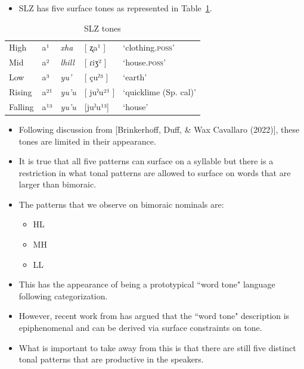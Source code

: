 \documentclass[12pt, letterpaper]{article}
\providecommand{\lsptoprule}{\midrule\toprule}
\providecommand{\lspbottomrule}{\bottomrule\midrule}
\begin{document}
\begin{itemize}
	\item SLZ has five surface tones as represented in Table~\ref{tab:tones}.
\end{itemize}

\begin{table}[!h]
	\centering
	\caption{SLZ tones}
	\label{tab:tones}
	 \begin{tabular}{lllll}
	  \lsptoprule
	  High   	&  a¹  &  \textit{xha}   &  [ ʐa¹ ] & `clothing.\textsc{poss}'\\
		Mid    	&  a²  &  \textit{lhill} 	& [ ɾiʒ² ] & `house.\textsc{poss}' \\
		Low   	&  a³  &  \textit{yu'} 	&	 [ çuˀ³ ] & `earth'\\
		Rising	&  a²¹  &  \textit{yu'u} 	&	[ juˀu²¹ ] & `quicklime (Sp. cal)' \\
		Falling &  a¹³  &  \textit{yu'u}  &	[juˀu¹³] &	`house' \\
	  \lspbottomrule
	 \end{tabular}
\end{table}

\begin{itemize}
	\item Following discussion from [Brinkerhoff, Duff, \& Wax Cavallaro (2022)], these tones are limited in their appearance.
	\item It is true that all five patterns can surface on a syllable but there is a restriction in what tonal patterns are allowed to surface on words that are larger than bimoraic.
	\item The patterns that we observe on bimoraic nominals are:
	\begin{itemize}
		\item HL 
		\item MH 
		\item LL 
	\end{itemize}
	\item This has the appearance of being a prototypical ``word tone" language following  categorization. 
	\item However, recent work from \citet{shihAutosegmentalAimsSurfaceOptimizing2019,mcphersonWordToneEpiphenomenalInpress} has argued that the ``word tone" description is epiphenomenal and can be derived via surface constraints on tone. 
	\item What is important to take away from this is that there are still five distinct tonal patterns that are productive in the speakers. 
\end{itemize}
\end{document}
